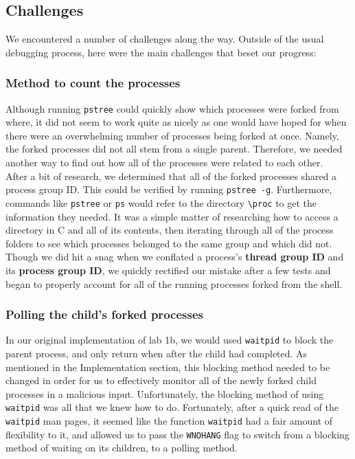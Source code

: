 \documentclass{article}
\begin{document}
\subsection{Challenges}
We encountered a number of challenges along the way. Outside of the usual 
debugging process, here were the main challenges that beset our progress:
\subsubsection{Method to count the processes}
Although running \verb+pstree+ could quickly show which processes were forked
from where, it did not seem to work quite as nicely as one would have hoped for
when there were an overwhelming number of processes being forked at once. 
Namely, the forked processes did not all stem from a single parent. Therefore, 
we needed another way to find out how all of the processes were related to each
other. \\
After a bit of research, we determined that all of the forked processes shared 
a process group ID. This could be verified by running \verb+pstree -g+.
Furthermore, commands like \verb+pstree+ or \verb+ps+ would refer to the
directory \verb+\proc+ to get the information they needed. It was a simple 
matter of researching how to access a directory in C and all of its contents, 
then iterating through all of the process folders to see which processes 
belonged to the same group and which did not. Though we did hit a snag when we
conflated a process's \textbf{thread group ID} and its \textbf{process group 
ID}, we quickly rectified our mistake after a few tests and began to properly
account for all of the running processes forked from the shell.
\subsubsection{Polling the child's forked processes}
In our original implementation of lab 1b, we would used \verb+waitpid+ to block
the parent process, and only return when after the child had completed. As
mentioned in the Implementation section, this blocking method needed to be 
changed in order for us to effectively monitor all of the newly forked child 
processes in a malicious input. Unfortunately, the blocking method of using
\verb+waitpid+ was all that we knew how to do. Fortunately, after a quick read
of the \verb+waitpid+ man pages, it seemed like the function \verb+waitpid+ 
had a fair amount of flexibility to it, and allowed us to pass the
\verb+WNOHANG+ flag to switch from a blocking method of waiting on its 
children, to a polling method.
\end{document}
